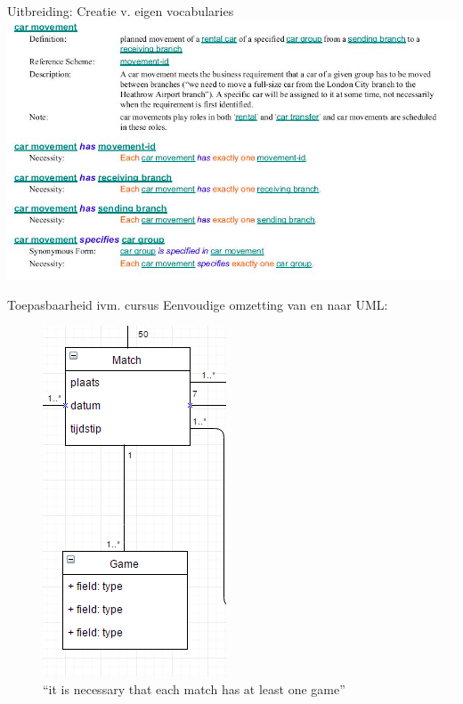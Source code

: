 \documentclass[t,12pt,english
\ifx\beamermode\undefined\else,\beamermode\fi
]{beamer}
\begin{document}
\begin{frame}{Uitbreiding: Creatie v. eigen vocabularies}
	\includegraphics[scale=0.50]{assets/custom.png}
\end{frame}

\begin{frame}{Toepasbaarheid ivm. cursus}
	Eenvoudige omzetting van en naar UML:
	\begin{figure}
	\includegraphics[scale=0.3]{assets/uml.png}
	\caption{``it is necessary that each match has at least one game''}
	\end{figure}
\end{frame}
\end{document}

